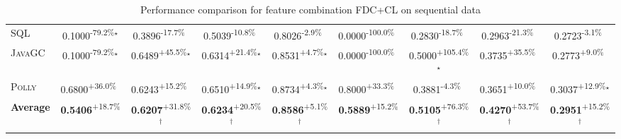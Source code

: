 \begin{table}[htbp]
\begin{tabular}{l|cccc|cccc}
\textsc{SQL} & \cellcolor{red!30}0.1000\textsuperscript{-79.2\%}$^\star$ & \cellcolor{red!30}0.3896\textsuperscript{-17.7\%}$^{\,\,\,}$ & \cellcolor{red!30}0.5039\textsuperscript{-10.8\%}$^{\,\,\,}$ & \cellcolor{red!30}0.8026\textsuperscript{-2.9\%}$^{\,\,\,}$ & \cellcolor{red!30}0.0000\textsuperscript{-100.0\%}$^{\,\,\,}$ & \cellcolor{red!30}0.2830\textsuperscript{-18.7\%}$^{\,\,\,}$ & \cellcolor{red!30}0.2963\textsuperscript{-21.3\%}$^{\,\,\,}$ & \cellcolor{red!30}0.2723\textsuperscript{-3.1\%}$^{\,\,\,}$ \\
\textsc{JavaGC} & \cellcolor{red!30}0.1000\textsuperscript{-79.2\%}$^\star$ & \cellcolor{green!30}0.6489\textsuperscript{+45.5\%}$^\star$ & \cellcolor{green!30}0.6314\textsuperscript{+21.4\%}$^\star$ & \cellcolor{green!30}0.8531\textsuperscript{+4.7\%}$^\star$ & \cellcolor{red!30}0.0000\textsuperscript{-100.0\%}$^{\,\,\,}$ & \cellcolor{green!30}0.5000\textsuperscript{+105.4\%}$^\star$ & \cellcolor{green!30}0.3735\textsuperscript{+35.5\%}$^{\,\,\,}$ & \cellcolor{green!30}0.2773\textsuperscript{+9.0\%}$^{\,\,\,}$ \\
\textsc{Polly} & \cellcolor{green!30}0.6800\textsuperscript{+36.0\%}$^{\,\,\,}$ & \cellcolor{green!30}0.6243\textsuperscript{+15.2\%}$^{\,\,\,}$ & \cellcolor{green!30}0.6510\textsuperscript{+14.9\%}$^\star$ & \cellcolor{green!30}0.8734\textsuperscript{+4.3\%}$^\star$ & \cellcolor{green!30}0.8000\textsuperscript{+33.3\%}$^{\,\,\,}$ & \cellcolor{red!30}0.3881\textsuperscript{-4.3\%}$^{\,\,\,}$ & \cellcolor{green!30}0.3651\textsuperscript{+10.0\%}$^{\,\,\,}$ & \cellcolor{green!30}0.3037\textsuperscript{+12.9\%}$^\star$ \\
\hline
\textbf{Average} & \cellcolor{green!30}\textbf{0.5406}\textsuperscript{+18.7\%}$^{\,\,\,}$ & \cellcolor{green!30}\textbf{0.6207}\textsuperscript{+31.8\%}$^\dagger$ & \cellcolor{green!30}\textbf{0.6234}\textsuperscript{+20.5\%}$^\dagger$ & \cellcolor{green!30}\textbf{0.8586}\textsuperscript{+5.1\%}$^\dagger$ & \cellcolor{green!30}\textbf{0.5889}\textsuperscript{+15.2\%}$^{\,\,\,}$ & \cellcolor{green!30}\textbf{0.5105}\textsuperscript{+76.3\%}$^\dagger$ & \cellcolor{green!30}\textbf{0.4270}\textsuperscript{+53.7\%}$^\dagger$ & \cellcolor{green!30}\textbf{0.2951}\textsuperscript{+15.2\%}$^\dagger$ \\
\hline
\end{tabular}
\caption{Performance comparison for feature combination FDC+CL on sequential data}
\label{tab:combo_FDC_CL_performance_sequential}
\end{table}